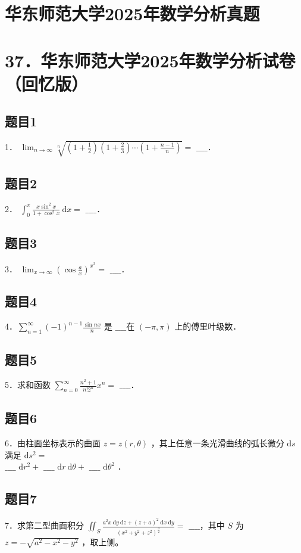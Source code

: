 \documentclass{article}
\begin{document}
\section*{华东师范大学2025年数学分析真题}
\section*{37．华东师范大学2025年数学分析试卷（回忆版）}

\subsection{题目1}
1． \(\lim _{n \rightarrow \infty} \sqrt[n]{\left(1+\frac{1}{2}\right)\left(1+\frac{2}{3}\right) \cdots\left(1+\frac{n-1}{n}\right)}=\) \(\_\_\_\_\)．

\subsection{题目2}
2． \(\int_{0}^{\pi} \frac{x \sin ^{2} x}{1+\cos ^{2} x} \mathrm{~d} x=\) \(\_\_\_\_\)．

\subsection{题目3}
3． \(\lim _{x \rightarrow \infty}\left(\cos \frac{a}{x}\right)^{x^{2}}=\) \(\_\_\_\_\)．

\subsection{题目4}
4．\(\sum_{n=1}^{\infty}(-1)^{n-1} \frac{\sin n x}{n}\) 是 \(\_\_\_\_\)在 \((-\pi, \pi)\) 上的傅里叶级数．

\subsection{题目5}
5．求和函数 \(\sum_{n=0}^{\infty} \frac{n^{2}+1}{n!2^{n}} x^{n}=\) \(\_\_\_\_\)．

\subsection{题目6}
6．由柱面坐标表示的曲面 \(z=z(r, \theta)\) ，其上任意一条光滑曲线的弧长微分 \(\mathrm{d} s\) 满足 \(\mathrm{d} s^{2}=\)\\
\(\_\_\_\_\) \(\mathrm{d} r^{2}+\) \(\_\_\_\_\) \(\mathrm{d} r \mathrm{~d} \theta+\) \(\_\_\_\_\) \(\mathrm{d} \theta^{2}\) ．

\subsection{题目7}
7．求第二型曲面积分 \(\iint_{S} \frac{a^{2} x \mathrm{~d} y \mathrm{~d} z+(z+a)^{2} \mathrm{~d} x \mathrm{~d} y}{\left(x^{2}+y^{2}+z^{2}\right)^{\frac{3}{2}}}=\) \(\_\_\_\_\)，其中 \(S\) 为 \(z=-\sqrt{a^{2}-x^{2}-y^{2}}\) ，取上侧。
\end{document}
